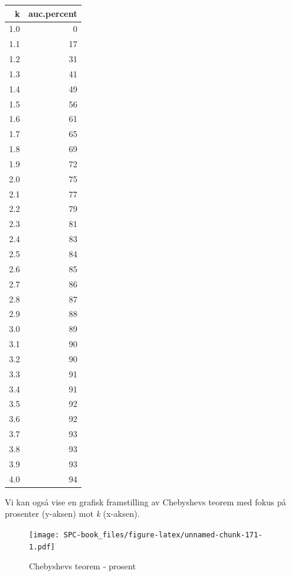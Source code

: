 \documentclass[
]{book}
\begin{document}
\begin{table}
\centering
\begin{tabular}[t]{r|r}
\hline
k & auc.percent\\
\hline
1.0 & 0\\
\hline
1.1 & 17\\
\hline
1.2 & 31\\
\hline
1.3 & 41\\
\hline
1.4 & 49\\
\hline
1.5 & 56\\
\hline
1.6 & 61\\
\hline
1.7 & 65\\
\hline
1.8 & 69\\
\hline
1.9 & 72\\
\hline
2.0 & 75\\
\hline
2.1 & 77\\
\hline
2.2 & 79\\
\hline
2.3 & 81\\
\hline
2.4 & 83\\
\hline
2.5 & 84\\
\hline
2.6 & 85\\
\hline
2.7 & 86\\
\hline
2.8 & 87\\
\hline
2.9 & 88\\
\hline
3.0 & 89\\
\hline
3.1 & 90\\
\hline
3.2 & 90\\
\hline
3.3 & 91\\
\hline
3.4 & 91\\
\hline
3.5 & 92\\
\hline
3.6 & 92\\
\hline
3.7 & 93\\
\hline
3.8 & 93\\
\hline
3.9 & 93\\
\hline
4.0 & 94\\
\hline
\end{tabular}
\end{table}

Vi kan også vise en grafisk framstilling av Chebyshevs teorem med fokus på prosenter (y-aksen) mot \emph{k} (x-aksen).

\begin{figure}
\centering
\texttt{[image: SPC-book\_files/figure-latex/unnamed-chunk-171-1.pdf]}
\caption{\label{fig:unnamed-chunk-171}Chebyshevs teorem - prosent}
\end{figure}
\end{document}
